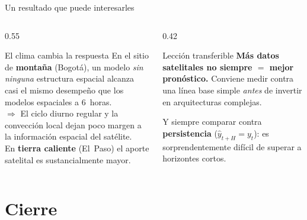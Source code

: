 \documentclass[10pt,aspectratio=169]{beamer}
\begin{document}
\begin{frame}{Un resultado que puede interesarles}
  \begin{columns}[T]
    \begin{column}{0.55\textwidth}
      \begin{block}{El clima cambia la respuesta}
        \small
        En el sitio de \textbf{montaña} (Bogotá), un modelo \emph{sin ninguna}
        estructura espacial alcanza casi el mismo desempeño que los modelos
        espaciales a 6~horas.\\[0.3em]
        $\Rightarrow$ El ciclo diurno regular y la convección local dejan poco
        margen a la información espacial del satélite.\\[0.3em]
        En \textbf{tierra caliente} (El~Paso) el aporte satelital es
        sustancialmente mayor.
      \end{block}
    \end{column}
    \begin{column}{0.42\textwidth}
      \begin{alertblock}{Lección transferible}
        \small
        \textbf{Más datos satelitales no siempre $=$ mejor pronóstico.}
        Conviene medir contra una línea base simple \emph{antes} de invertir en
        arquitecturas complejas.
      \end{alertblock}
      \footnotesize
      Y siempre comparar contra \textbf{persistencia}
      ($\hat{y}_{t+H} = y_t$): es sorprendentemente difícil de superar a
      horizontes cortos.
    \end{column}
  \end{columns}
\end{frame}

\section{Cierre}
\end{document}
